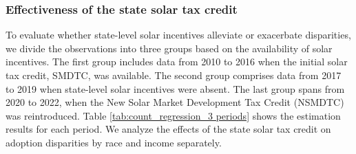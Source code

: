 \documentclass[12pt,twoside,letterpaper]{article}
\begin{document}


\subsubsection{Effectiveness of the state solar tax credit}

To evaluate whether state-level solar incentives alleviate or exacerbate disparities, we divide the observations into three groups based on the availability of solar incentives. The first group includes data from 2010 to 2016 when the initial solar tax credit, SMDTC, was available. The second group comprises data from 2017 to 2019 when state-level solar incentives were absent. The last group spans from 2020 to 2022, when the New Solar Market Development Tax Credit (NSMDTC) was reintroduced. Table \ref{tab:count_regression_3 periods} shows the estimation results for each period. We analyze the effects of the state solar tax credit on adoption disparities by race and income separately.
\end{document}
